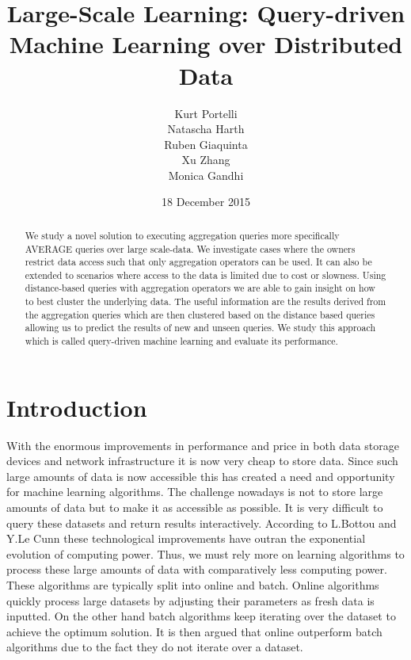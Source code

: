 \documentclass{lmproj}
\begin{document}
\title{Large-Scale Learning: Query-driven Machine Learning over Distributed Data}
\author{Kurt Portelli \\
        Natascha Harth \\
        Ruben Giaquinta \\
        Xu Zhang \\
        Monica Gandhi}
\date{18 December 2015}
\maketitle
\begin{abstract}
We study a novel solution to executing aggregation queries more specifically AVERAGE queries over large scale-data. We investigate cases where the owners restrict data access such that only aggregation operators can be used. It can also be extended to scenarios where access to the data is limited due to cost or slowness. Using distance-based queries with aggregation operators we are able to gain insight on how to best cluster the underlying data. The useful information are the results derived from the aggregation queries which are then clustered based on the distance based queries allowing us to predict the results of new and unseen queries. We study this approach which is called query-driven machine learning and evaluate its performance.

\end{abstract}
\educationalconsent
\tableofcontents
\chapter{Introduction}
\label{intro}
With the enormous improvements in performance and price in both data storage devices and network infrastructure it is now very cheap to store data. Since such large amounts of data is now accessible this has created a need and opportunity for machine learning algorithms.\cite{LargeScaleOnlineLearning} The challenge nowadays is not to store large amounts of data but to make it as accessible as possible. It is very difficult to query these datasets and return results interactively. According to L.Bottou and Y.Le Cunn\cite{LargeScaleOnlineLearning} these technological improvements have outran the exponential evolution of computing power. Thus, we must rely more on learning algorithms to process these large amounts of data with comparatively less computing power. These algorithms are typically split into online and batch. Online algorithms quickly process large datasets by adjusting their parameters as fresh data is inputted. On the other hand batch algorithms keep iterating over the dataset to achieve the optimum solution. It is then argued that online outperform batch algorithms due to the fact they do not iterate over a dataset.\cite{LargeScaleOnlineLearning}
\end{document}
